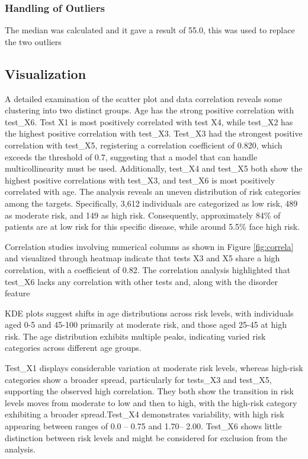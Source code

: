 \documentclass[a4paper]{article}
\begin{document}
\subsubsection{Handling of Outliers}
 The median was calculated and it gave a result of 55.0, this was used to replace the two outliers
\subsection{Visualization}

A detailed examination of the scatter plot and data correlation reveals some clustering into two distinct groups. Age has the strong positive correlation with test\_X6. Test X1 is most positively correlated with test X4, while test\_X2 has the highest positive correlation with test\_X3. Test\_X3 had the strongest positive correlation with test\_X5, registering a correlation coefficient of 0.820, which exceeds the threshold of 0.7, suggesting that a model that can handle multicollinearity must be used. Additionally, test\_X4 and test\_X5 both show the highest positive correlations with test\_X3, and test\_X6 is most positively correlated with age.
The analysis reveals an uneven distribution of risk categories among the targets. Specifically, 3,612 individuals are categorized as low risk, 489 as moderate risk, and 149 as high risk. Consequently, approximately 84\% of patients are at low risk for this specific disease, while around 5.5\% face high risk.

Correlation studies involving numerical columns as shown in Figure \ref{fig:correla} and visualized through heatmap indicate that tests X3 and X5 share a high correlation, with a coefficient of 0.82. The correlation analysis highlighted that test\_X6 lacks any correlation with other tests and, along with the disorder feature

KDE plots suggest shifts in age distributions across risk levels, with individuals aged 0-5 and 45-100 primarily at moderate risk, and those aged 25-45 at high risk. The age distribution exhibits multiple peaks, indicating varied risk categories across different age groups.

Test\_X1 displays considerable variation at moderate risk levels, whereas high-risk categories show a broader spread, particularly for tests\_X3 and test\_X5, supporting the observed high correlation. They both show the transition in risk levels moves from moderate to low and then to high, with the high-risk category exhibiting a broader spread.Test\_X4 demonstrates variability, with high risk appearing between ranges of 0.0 – 0.75 and 1.70– 2.00. Test\_X6 shows little distinction between risk levels and might be considered for exclusion from the analysis.
\end{document}

